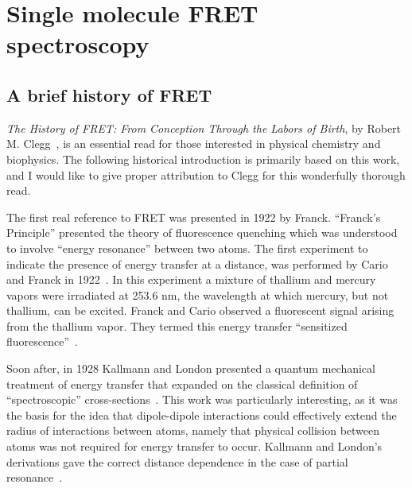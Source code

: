 \chapter{Single molecule FRET spectroscopy
\label{chpt:smFRET}}

\section{A brief history of FRET
\label{sec:smFRET}}

\textit{The History of FRET: From Conception Through the Labors of Birth}, by Robert M. Clegg~\cite{clegg_history}, is an essential read for those interested in physical chemistry and biophysics. 
The following historical introduction is primarily based on this work, and I would like to give proper attribution to Clegg for this wonderfully thorough read.

The first real reference to \ac{FRET} was presented in 1922 by Franck. 
\enquote{Franck's Principle} presented the theory of fluorescence quenching which was understood to involve \enquote{energy resonance} between two atoms.
The first experiment to indicate the presence of energy transfer at a distance, was performed by Cario and Franck in 1922~\cite{clegg_history}. 
In this experiment a mixture of thallium and mercury vapors were irradiated at 253.6 nm, the wavelength at which mercury, but not thallium, can be excited.
Franck and Cario observed a fluorescent signal arising from the thallium vapor.
They termed this energy transfer \enquote{sensitized fluorescence}~\cite{clegg_history}.

Soon after, in 1928 Kallmann and London presented a quantum mechanical treatment of energy transfer that expanded on the classical definition of \enquote{spectroscopic} cross-sections~\cite{Kallmann_London}.
This work was particularly interesting, as it was the basis for the idea that dipole-dipole interactions could effectively extend the radius of interactions between atoms, namely that physical collision between atoms was not required for energy transfer to occur.
Kallmann and London's derivations gave the correct distance dependence in the case of partial resonance~\cite{clegg_history}. 

